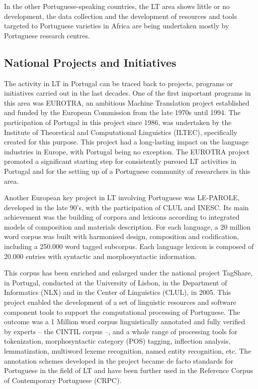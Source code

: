 \begin{multicols}{2}
In the other Portuguese-speaking countries, the LT area shows little or no development, the data collection and the development of resources and tools targeted to Portuguese varieties in Africa are being undertaken mostly by Portuguese research centres.

\subsection{National Projects and Initiatives}

The activity in LT in Portugal can be traced back to projects, programs or initiatives carried out in the last decades. One of the first important programs in this area was EUROTRA, an ambitious Machine Translation project established and funded by the European Commission from the late 1970s until 1994. The participation of Portugal in this project since 1986, was undertaken by the Institute of Theoretical and Computational Linguistics (ILTEC), specifically created for this purpose. This project had a long-lasting impact on the language industries in Europe, with Portugal being no exception. The EUROTRA project promoted a significant starting step for consistently pursued LT activities in Portugal and for the setting up of a Portuguese community of researchers in this area.

Another European key project in LT involving Portuguese was LE-PAROLE, developed in the late 90's, with the participation of CLUL and INESC. Its main achievement was the building of corpora and lexicons according to integrated models of composition and materials description. For each language, a 20 million word corpus was built with harmonised design, composition and codification, including a 250.000 word tagged subcorpus. Each language lexicon is composed of 20.000 entries with syntactic and morphosyntactic information.

This corpus has been enriched and enlarged under the national project TagShare, in Portugal, conducted at the University of Lisbon, in the Department of Informatics (NLX) and in the Center of Linguistics (CLUL), in 2005. This project enabled the development of a set of linguistic resources and software component tools to support the computational processing of Portuguese. The outcome was a 1 Million word corpus linguistically annotated and fully verified by experts – the CINTIL corpus\cite{cintil} –, and a whole range of processing tools for tokenization, morphosyntactic category (POS) tagging, inflection analysis, lemmatization, multiword lexeme recognition, named entity recognition, etc. The annotation schemes developed in the project became de facto standards for Portuguese in the field of LT and have been further used in the Reference Corpus of Contemporary Portuguese (CRPC). 


\end{multicols}
